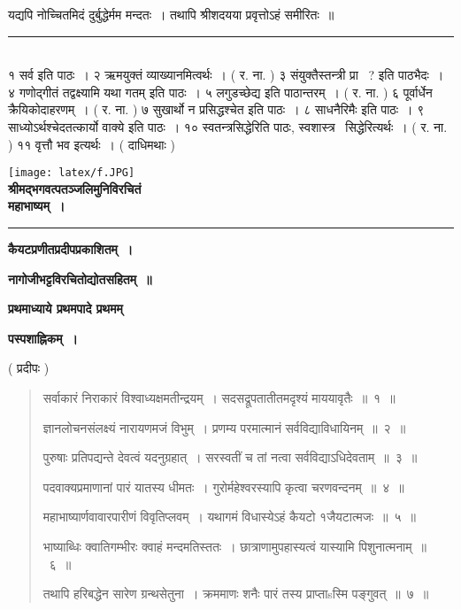 \documentclass[11pt, openany]{book}
\begin{document}
\begin{center}
यद्यपि नोच्चितमिदं दुर्बुद्धेर्मम मन्दतः~। तथापि श्रीशदयया प्रवृत्तोऽहं समीरितः~॥
\end{center}

\noindent
\rule{1\linewidth}{0.5pt}\\

१ सर्व इति पाठः~। २ ऋमयुक्तं व्याख्यानमित्वर्थः~। ( र. ना. ) ३ संयुक्तैस्तन्त्री प्रा \textendash\ ? इति पाठभैदः~। ४ गणोद्गीतं तद्वक्ष्यामि यथा गतम् इति पाठः~। ५ लगुडच्छेद्य इति पाठान्तरम्~। ( र. ना. ) ६ पूर्वार्धेन क्रैयिकोदाहरणम्~। ( र. ना. ) ७ {\qt सुखार्थो न प्रसिद्धश्चेत} इति पाठः~। ८ साधनैरिमैः इति पाठः~। ९ {\qt साध्योऽर्थश्चेदतत्कार्यो वाक्ये} इति पाठः~। १० स्वतन्त्रसिद्धेरिति पाठः, स्वशास्त्र \textendash\ सिद्धेरित्यर्थः~। ( र. ना. ) ११ वृत्तौ भव इत्यर्थः~। ( दाधिमथाः ) 

\newpage
\thispagestyle{empty}
\begin{center}
\texttt{[image: latex/f.JPG]}\\

\textbf{\large श्रीमद्भगवत्पतञ्जलिमुनिविरचितं}\\

\textbf{\LARGE महाभाष्यम्~।}\\

\rule{0.2\linewidth}{0.5pt}

\textbf{\large कैयटप्रणीतप्रदीपप्रकाशितम्~।}

\textbf{\large नागोजीभट्टविरचितोद्योतसहितम्~॥}

\textbf{\large प्रथमाध्याये प्रथमपादे प्रथमम् \textendash\ }

\textbf{पस्पशाह्निकम्~। }

 ( प्रदीपः ) 
\end{center}

\begin{quote}
{\mbh सर्वाकारं निराकारं विश्वाध्यक्षमतीन्द्रयम्~। सदसद्रूपतातीतमदृश्यं माययावृतैः~॥~१~॥

ज्ञानलोचनसंलक्ष्यं नारायणमजं विभुम्~। प्रणम्य परमात्मानं सर्वविद्याविधायिनम्~॥~२~॥

पुरुषाः प्रतिपद्यन्ते देवत्वं यदनुग्रहात्~। सरस्वतीं च तां नत्वा सर्वविद्याऽधिदेवताम्~॥~३~॥

पदवाक्यप्रमाणानां पारं यातस्य धीमतः~। गुरोर्महेश्वरस्यापि कृत्वा चरणवन्दनम्~॥~४~॥

महाभाष्यार्णवावारपारीणं विवृतिप्लवम्~। यथागमं विधास्येऽहं कैयटो १जैयटात्मजः~॥~५~॥

भाष्याब्धिः क्वातिगम्भीरः क्वाहं मन्दमतिस्ततः~। छात्राणामुपहास्यत्वं यास्यामि पिशुनात्मनाम्~॥~६~॥

तथापि हरिबद्धेन सारेण ग्रन्थसेतुना~। क्रममाणः शनैः पारं तस्य प्राप्ताsस्मि पङ्गुवत्~॥~७~॥}
\end{quote}
 
\end{document}
